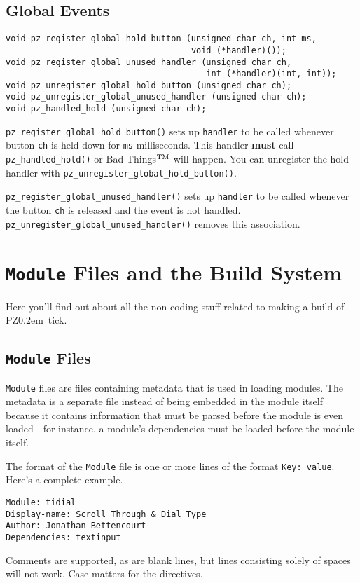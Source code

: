 \documentclass[12pt,letterpaper]{report}
\def\pz{{\footnotesize PZ}}
\def\pzt{\pz\kern0.2em{\large\oldstyle2}}
\let\ttt\tt
\def\tt{\def\_{{\ttt\char`\_}}\ttt}
\def\texttt#1{{\tt #1}}
\begin{document}
\section{Global Events}
\begin{verbatim}
void pz_register_global_hold_button (unsigned char ch, int ms,
                                     void (*handler)());
void pz_register_global_unused_handler (unsigned char ch,
                                        int (*handler)(int, int));
void pz_unregister_global_hold_button (unsigned char ch);
void pz_unregister_global_unused_handler (unsigned char ch);
void pz_handled_hold (unsigned char ch);
\end{verbatim}

\verb|pz_register_global_hold_button()| sets up \verb|handler| to be called
whenever button \verb|ch| is held down for \verb|ms| milliseconds. This handler
{\bf must} call \verb|pz_handled_hold()| or Bad Things$^{\rm TM}$ will happen.
You can unregister the hold handler with \verb|pz_unregister_global_hold_button()|.

\verb|pz_register_global_unused_handler()| sets up \verb|handler| to be called
whenever the button \verb|ch| is released and the event is not handled.
\verb|pz_|\hskip0pt\verb|unregister_|\hskip0pt\verb|global_unused_handler()| removes this association.

\chapter{\texttt{Module} Files and the Build System}
Here you'll find out about all the non-coding stuff related to making a build of \pzt\ tick.

\section{\texttt{Module} Files}\label{moddesc}
\verb|Module| files are files containing metadata that is used in loading modules.
The metadata is a separate file instead of being embedded in the module itself because it contains information
that must be parsed before the module is even loaded---for instance, a module's dependencies
must be loaded before the module itself.

The format of the \verb|Module| file is one or more lines of the format \verb|Key: value|.
Here's a complete example.
\begin{verbatim}
Module: tidial
Display-name: Scroll Through & Dial Type
Author: Jonathan Bettencourt
Dependencies: textinput
\end{verbatim}
Comments are supported, as are blank lines, but lines consisting solely of spaces will not work.
Case matters for the directives.
\end{document}
